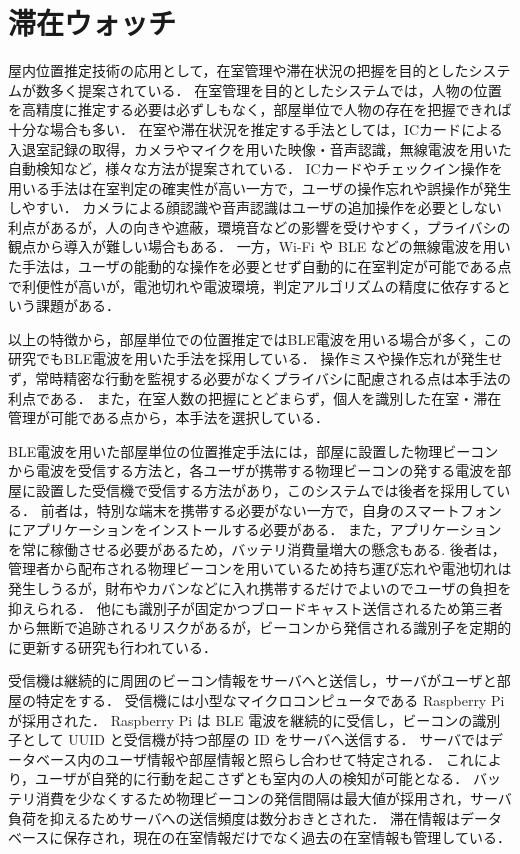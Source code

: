 \section{滞在ウォッチ}
屋内位置推定技術の応用として，在室管理や滞在状況の把握を目的としたシステムが数多く提案されている．
在室管理を目的としたシステムでは，人物の位置を高精度に推定する必要は必ずしもなく，部屋単位で人物の存在を把握できれば十分な場合も多い．
在室や滞在状況を推定する手法としては，ICカード\cite{ICcard}による入退室記録の取得，カメラやマイクを用いた映像・音声認識\cite{camera}\cite{voice}，無線電波を用いた自動検知\cite{WiFi}など，様々な方法が提案されている．
ICカードやチェックイン操作を用いる手法は在室判定の確実性が高い一方で，ユーザの操作忘れや誤操作が発生しやすい．
カメラによる顔認識や音声認識はユーザの追加操作を必要としない利点があるが，人の向きや遮蔽，環境音などの影響を受けやすく，プライバシの観点から導入が難しい場合もある．
一方，Wi-Fi や BLE などの無線電波を用いた手法は，ユーザの能動的な操作を必要とせず自動的に在室判定が可能である点で利便性が高いが，電池切れや電波環境，判定アルゴリズムの精度に依存するという課題がある．


以上の特徴から，部屋単位での位置推定ではBLE電波を用いる場合が多く，この研究でもBLE電波を用いた手法を採用している．
操作ミスや操作忘れが発生せず，常時精密な行動を監視する必要がなくプライバシに配慮される点は本手法の利点である．
また，在室人数の把握にとどまらず，個人を識別した在室・滞在管理が可能である点から，本手法を選択している．


BLE電波を用いた部屋単位の位置推定手法には，部屋に設置した物理ビーコンから電波を受信する方法\cite{BLE:EnvironmentBeacon}と，各ユーザが携帯する物理ビーコンの発する電波を部屋に設置した受信機で受信する方法\cite{BLE:UserBeacon}があり，このシステムでは後者を採用している．
前者は，特別な端末を携帯する必要がない一方で，自身のスマートフォンにアプリケーションをインストールする必要がある．
また，アプリケーションを常に稼働させる必要があるため，バッテリ消費量増大の懸念もある.
後者は，管理者から配布される物理ビーコンを用いているため持ち運び忘れや電池切れは発生しうるが，財布やカバンなどに入れ携帯するだけでよいのでユーザの負担を抑えられる．
他にも識別子が固定かつブロードキャスト送信されるため第三者から無断で追跡されるリスクがあるが，ビーコンから発信される識別子を定期的に更新する研究\cite{togawa}も行われている．


受信機は継続的に周囲のビーコン情報をサーバへと送信し，サーバがユーザと部屋の特定をする．
受信機には小型なマイクロコンピュータである Raspberry Pi\cite{RaspberryPi}が採用された．
Raspberry Pi は BLE 電波を継続的に受信し，ビーコンの識別子として UUID と受信機が持つ部屋の ID をサーバへ送信する．
サーバではデータベース内のユーザ情報や部屋情報と照らし合わせて特定される．
これにより，ユーザが自発的に行動を起こさずとも室内の人の検知が可能となる．
バッテリ消費を少なくするため物理ビーコンの発信間隔は最大値が採用され，サーバ負荷を抑えるためサーバへの送信頻度は数分おきとされた．
滞在情報はデータベースに保存され，現在の在室情報だけでなく過去の在室情報も管理している．


